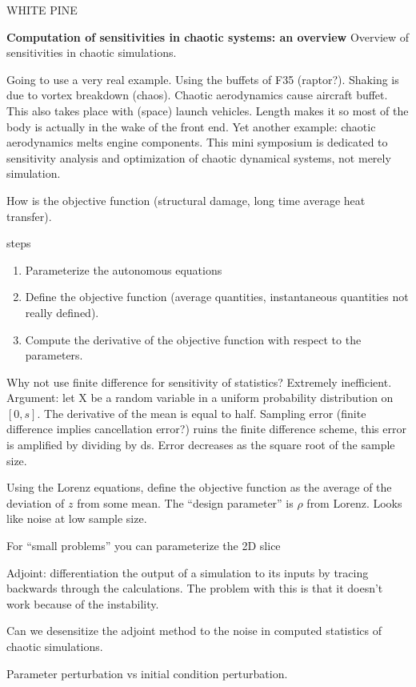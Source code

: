 \begin{description}
{\begin{description}
WHITE PINE

\item[Qiqi Wang]
\textbf{Computation of sensitivities in chaotic systems: an overview}
Overview of sensitivities in chaotic simulations.

Going to use a very real example. Using the
buffets of F35 (raptor?). Shaking is
due to vortex breakdown (chaos). Chaotic
aerodynamics cause aircraft buffet.
This also takes place with (space)
launch vehicles. Length makes it
so most of the body is actually in the wake of
the front end. Yet another example: chaotic
aerodynamics melts engine components.
This mini symposium is dedicated to
sensitivity analysis and optimization
of chaotic dynamical systems, not merely
simulation.

How is the objective function (structural
damage, long time average heat transfer).

steps
\begin{enumerate}
\item Parameterize the autonomous equations
\item Define the objective function (average quantities,
instantaneous quantities not really defined).
\item Compute the derivative of the objective function
with respect to the parameters.
\end{enumerate}

Why not use finite difference for sensitivity of statistics?
Extremely inefficient. Argument:
let X be a random variable in a uniform probability
distribution on $[0,s]$. The derivative of the mean
is equal to half. Sampling error (finite difference
implies cancellation error?) ruins the
finite difference scheme, this error is amplified
by dividing by ds.
Error decreases as the square root of the sample size.

Using the Lorenz equations, define the objective
function as the average of the deviation of $z$
from some mean. The ``design parameter'' is
$\rho$ from Lorenz. Looks like noise at low
sample size.

For ``small problems'' you can parameterize the
2D slice

Adjoint: differentiation the output of a simulation
to its inputs by tracing backwards through the calculations.
The problem with this is that it doesn't work because of the
instability.

Can we desensitize the adjoint method to the noise
in computed statistics of chaotic simulations.

Parameter perturbation vs initial condition perturbation.


\end{description}}
\end{description}
